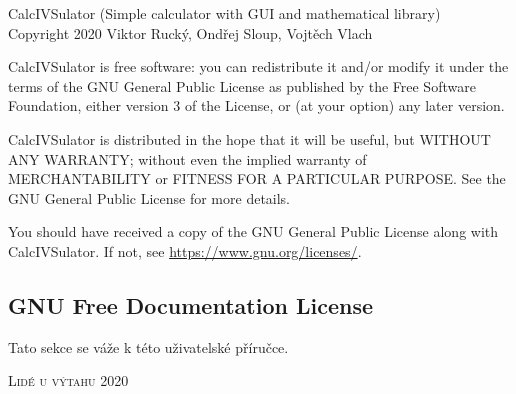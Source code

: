 \documentclass[a5paper,8pt,twoside]{extarticle}
\newcommand*\cleartoleftpage{%
  \clearpage
  \ifodd\value{page}\hbox{}\newpage\fi
}
\begin{document}
    \begin{otherlanguage}{english}
    CalcIVSulator (Simple calculator with GUI and mathematical library)\\
    Copyright \textcopyright{} 2020 Viktor Rucký, Ondřej Sloup, Vojtěch Vlach

    CalcIVSulator is free software: you can redistribute it and/or modify
    it under the terms of the GNU General Public License as published by
    the Free Software Foundation, either version 3 of the License, or
    (at your option) any later version.

    CalcIVSulator is distributed in the hope that it will be useful,
    but WITHOUT ANY WARRANTY; without even the implied warranty of
    MERCHANTABILITY or FITNESS FOR A PARTICULAR PURPOSE.  See the
    GNU General Public License for more details.

    You should have received a copy of the GNU General Public License
    along with CalcIVSulator.  If not, see \url{https://www.gnu.org/licenses/}.
    \end{otherlanguage}

    \subsection{GNU Free Documentation License}
    Tato sekce se váže k této uživatelské příručce.

    

    \cleartoleftpage
    \thispagestyle{empty}
    \null
    \vfill
    {\large \textsc{\textcopyright{} Lidé u výtahu 2020}}
\end{document}
